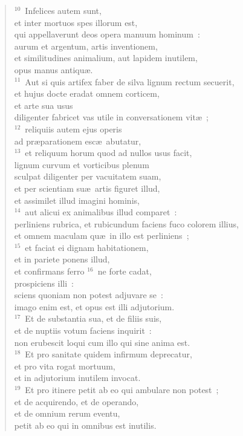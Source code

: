 \begin{verse}${}^{10}$~Infelices autem sunt,\\ et inter mortuos spes illorum est,\\ qui appellaverunt deos opera manuum hominum~:\\ aurum et argentum, artis inventionem,\\ et similitudines animalium, aut lapidem inutilem,\\ opus manus antiqu\ae .\\
${}^{11}$~Aut si quis artifex faber de silva lignum rectum secuerit,\\ et hujus docte eradat omnem corticem,\\ et arte sua usus\\ diligenter fabricet vas utile in conversationem vit\ae~;\\
${}^{12}$~reliquiis autem ejus operis\\ ad pr\ae parationem esc\ae\ abutatur,\\
${}^{13}$~et reliquum horum quod ad nullos usus facit,\\ lignum curvum et vorticibus plenum\\ sculpat diligenter per vacuitatem suam,\\ et per scientiam su\ae\ artis figuret illud,\\ et assimilet illud imagini hominis,\\
${}^{14}$~aut alicui ex animalibus illud comparet~:\\ perliniens rubrica, et rubicundum faciens fuco colorem illius,\\ et omnem maculam qu\ae\ in illo est perliniens~;\\
${}^{15}$~et faciat ei dignam habitationem,\\ et in pariete ponens illud,\\ et confirmans ferro
${}^{16}$~ne forte cadat,\\ prospiciens illi~:\\ sciens quoniam non potest adjuvare se~:\\ imago enim est, et opus est illi adjutorium.\\
${}^{17}$~Et de substantia sua, et de filiis suis,\\ et de nuptiis votum faciens inquirit~:\\ non erubescit loqui cum illo qui sine anima est.\\
${}^{18}$~Et pro sanitate quidem infirmum deprecatur,\\ et pro vita rogat mortuum,\\ et in adjutorium inutilem invocat.\\
${}^{19}$~Et pro itinere petit ab eo qui ambulare non potest~;\\ et de acquirendo, et de operando,\\ et de omnium rerum eventu,\\ petit ab eo qui in omnibus est inutilis.\end{verse}


